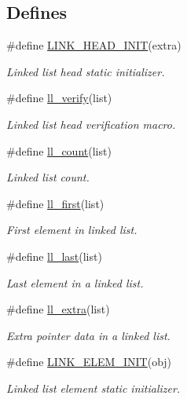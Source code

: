 \subsection*{Defines}
\begin{CompactItemize}
\item 
\#define \hyperlink{group__dbprim__link_a13}{LINK\_\-HEAD\_\-INIT}(extra)
\begin{CompactList}\small\item\em Linked list head static initializer. \item\end{CompactList}\item 
\#define \hyperlink{group__dbprim__link_a14}{ll\_\-verify}(list)
\begin{CompactList}\small\item\em Linked list head verification macro. \item\end{CompactList}\item 
\#define \hyperlink{group__dbprim__link_a15}{ll\_\-count}(list)
\begin{CompactList}\small\item\em Linked list count. \item\end{CompactList}\item 
\#define \hyperlink{group__dbprim__link_a16}{ll\_\-first}(list)
\begin{CompactList}\small\item\em First element in linked list. \item\end{CompactList}\item 
\#define \hyperlink{group__dbprim__link_a17}{ll\_\-last}(list)
\begin{CompactList}\small\item\em Last element in a linked list. \item\end{CompactList}\item 
\#define \hyperlink{group__dbprim__link_a18}{ll\_\-extra}(list)
\begin{CompactList}\small\item\em Extra pointer data in a linked list. \item\end{CompactList}\item 
\#define \hyperlink{group__dbprim__link_a19}{LINK\_\-ELEM\_\-INIT}(obj)
\begin{CompactList}\small\item\em Linked list element static initializer. \item\end{CompactList}\item 

\end{CompactItemize}

